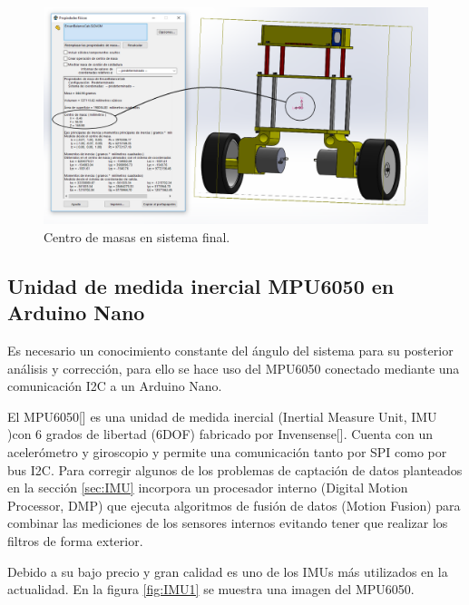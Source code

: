 \begin{figure}[H]
	\center
	\includegraphics[scale=0.4]{imagenes/Balancing_robot/center_mass}
	\caption{Centro de masas en sistema final.}
	\label{fig:center_mass}
\end{figure}

\subsection{Unidad de medida inercial MPU6050 en Arduino Nano}\label{sec:MPU6050}

Es necesario un conocimiento constante del ángulo del sistema para su posterior análisis y corrección, para ello se hace uso del MPU6050 conectado mediante una comunicación I2C a un Arduino Nano. \newline

El MPU6050[] es una unidad de medida inercial (Inertial Measure Unit, IMU )con 6 grados de libertad (6DOF) fabricado por Invensense[]. Cuenta con un acelerómetro y giroscopio y permite una comunicación tanto por SPI como por bus I2C. Para corregir algunos de los problemas de captación de datos planteados en la sección \ref{sec:IMU} incorpora un procesador interno (Digital Motion Processor, DMP) que ejecuta algoritmos de fusión de datos (Motion Fusion) para combinar las mediciones de los sensores internos evitando tener que realizar los filtros de forma exterior.\newline

Debido a su bajo precio y gran calidad es uno de los IMUs más utilizados en la actualidad.
En la figura \ref{fig:IMU1} se muestra una imagen del MPU6050.

